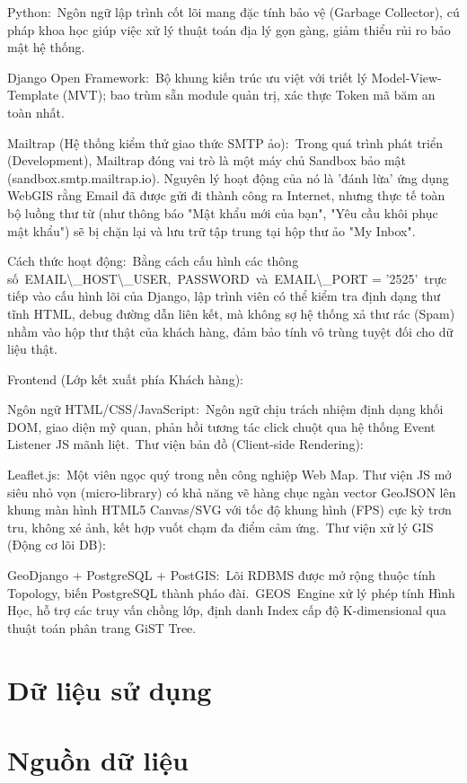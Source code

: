 \documentclass[13pt,a4paper]{report}
\begin{document}
Python: Ngôn ngữ lập trình cốt lõi mang đặc tính bảo vệ (Garbage Collector), cú pháp khoa học giúp việc xử lý thuật toán địa lý gọn gàng, giảm thiểu rủi ro bảo mật hệ thống.

Django Open Framework: Bộ khung kiến trúc ưu việt với triết lý Model-View-Template (MVT); bao trùm sẵn module quản trị, xác thực Token mã băm an toàn nhất.

Mailtrap (Hệ thống kiểm thử giao thức SMTP ảo): Trong quá trình phát triển (Development), Mailtrap đóng vai trò là một máy chủ Sandbox bảo mật (sandbox.smtp.mailtrap.io). Nguyên lý hoạt động của nó là 'đánh lừa' ứng dụng WebGIS rằng Email đã được gửi đi thành công ra Internet, nhưng thực tế toàn bộ luồng thư từ (như thông báo "Mật khẩu mới của bạn", "Yêu cầu khôi phục mật khẩu") sẽ bị chặn lại và lưu trữ tập trung tại hộp thư ảo "My Inbox".

Cách thức hoạt động: Bằng cách cấu hình các thông số EMAIL\textbackslash{}_HOST\textbackslash{}_USER, PASSWORD và EMAIL\textbackslash{}_PORT = '2525' trực tiếp vào cấu hình lõi của Django, lập trình viên có thể kiểm tra định dạng thư tĩnh HTML, debug đường dẫn liên kết, mà không sợ hệ thống xả thư rác (Spam) nhầm vào hộp thư thật của khách hàng, đảm bảo tính vô trùng tuyệt đối cho dữ liệu thật.

Frontend (Lớp kết xuất phía Khách hàng):

Ngôn ngữ HTML/CSS/JavaScript: Ngôn ngữ chịu trách nhiệm định dạng khối DOM, giao diện mỹ quan, phản hồi tương tác click chuột qua hệ thống Event Listener JS mãnh liệt. Thư viện bản đồ (Client-side Rendering):

Leaflet.js: Một viên ngọc quý trong nền công nghiệp Web Map. Thư viện JS mở siêu nhỏ vọn (micro-library) có khả năng vẽ hàng chục ngàn vector GeoJSON lên khung màn hình HTML5 Canvas/SVG với tốc độ khung hình (FPS) cực kỳ trơn tru, không xé ảnh, kết hợp vuốt chạm đa điểm cảm ứng. Thư viện xử lý GIS (Động cơ lõi DB):

GeoDjango + PostgreSQL + PostGIS: Lõi RDBMS được mở rộng thuộc tính Topology, biến PostgreSQL thành pháo đài. GEOS Engine xử lý phép tính Hình Học, hỗ trợ các truy vấn chồng lớp, định danh Index cấp độ K-dimensional qua thuật toán phân trang GiST Tree.

\section{Dữ liệu sử dụng}

\section{Nguồn dữ liệu}
\end{document}
